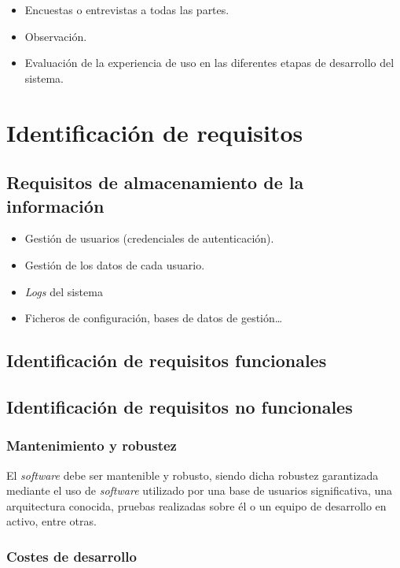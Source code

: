 \begin{itemize}
  \item Encuestas o entrevistas a todas las partes.
  \item Observación.
  \item Evaluación de la experiencia de uso en las diferentes etapas de desarrollo del sistema.
\end{itemize}

\section{Identificación de requisitos}
\citationneeded[TODO]
\subsection{Requisitos de almacenamiento de la información}

\begin{itemize}
  \item Gestión de usuarios (credenciales de autenticación).
  \item Gestión de los datos de cada usuario.
  \item \textit{Logs} del sistema
  \item Ficheros de configuración, bases de datos de gestión\dots
\end{itemize}

\subsection{Identificación de requisitos funcionales}


\subsection{Identificación de requisitos no funcionales}

\subsubsection{Mantenimiento y robustez}

El \textit{software} debe ser mantenible y robusto, siendo dicha robustez garantizada mediante el uso de \textit{software} utilizado por una base de usuarios significativa, una arquitectura conocida, pruebas realizadas sobre él o un equipo de desarrollo en activo, entre otras.

\subsubsection{Costes de desarrollo}

